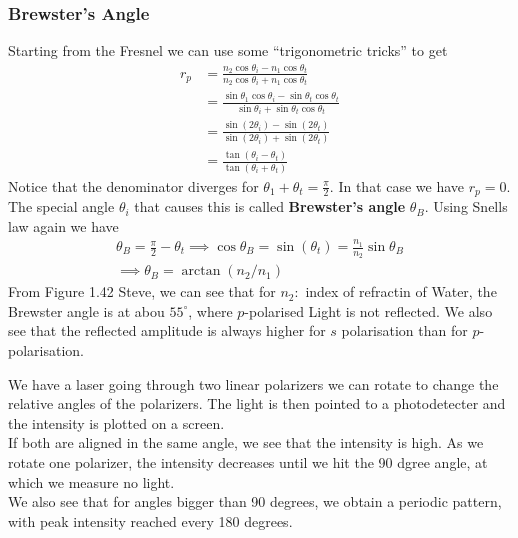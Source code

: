 \subsubsection{Brewster's Angle}
Starting from the Fresnel we can use some ``trigonometric tricks'' to get
\begin{align*}
	r_p &= \frac{n_2 \cos \theta_i - n_1 \cos \theta_t}{n_2 \cos \theta_i + n_1 \cos \theta_t}\\
			&= \frac{\sin \theta_1 \cos \theta_i - \sin \theta_t \cos \theta_t}{\sin \theta_i + \sin \theta_t \cos \theta_t}\\
			&= \frac{\sin(2 \theta_i) - \sin(2 \theta_t)}{\sin(2 \theta_i) + \sin(2 \theta_t)}\\
			&= \frac{\tan(\theta_i -  \theta_t)}{\tan(\theta_i + \theta_t)}
\end{align*}
Notice that the denominator diverges for $\theta_1 + \theta_t = \frac{\pi}{2}$. In that case we have $r_p = 0$. The special angle $\theta_i$ that causes this is called \textbf{Brewster's angle} $\theta_B$. Using Snells law again we have
\begin{align*}
	\theta_B = \frac{\pi}{2} - \theta_t \implies \cos\theta_B = \sin(\theta_t) = \frac{n_1}{n_2} \sin \theta_B\\
	\implies \theta_B = \arctan(n_2/n_1)
\end{align*}
From Figure 1.42 Steve, we can see that for $n_2:$ index of refractin of Water, the Brewster angle is at abou $55^{\circ}$, where $p$-polarised Light is not reflected. We also see that the reflected amplitude is always higher for $s$ polarisation than for $p$-polarisation.

\begin{demo}[]
We have a laser going through two linear polarizers we can rotate to change the relative angles of the polarizers. The light is then pointed to a photodetecter and the intensity is plotted on a screen.\\
If both are aligned in the same angle, we see that the intensity is high. As we rotate one polarizer, the intensity decreases until we hit the 90 dgree angle, at which we measure no light.\\
We also see that for angles bigger than 90 degrees, we obtain a periodic pattern, with peak intensity reached every 180 degrees.
\end{demo}

